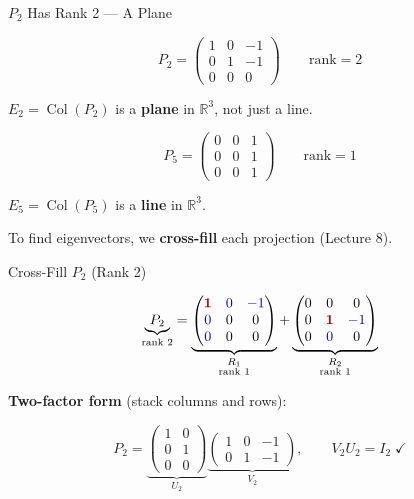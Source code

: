 \documentclass[10pt]{beamer}
\theoremstyle{definition}
\newcommand{\x}[1]{\alert{\textbf{#1}}}
\newcommand{\pvt}[1]{{\color{red!70!black}\textbf{#1}}}
\newcommand{\crs}[1]{{\color{blue!70!black}#1}}
\begin{document}
\begin{frame}{$P_2$ Has Rank 2 --- A Plane}

$$P_2 = \begin{pmatrix}1&0&-1\\0&1&-1\\0&0&0\end{pmatrix} \qquad \text{rank} = 2$$

\vfill

$E_2 = \operatorname{Col}(P_2)$ is a \x{plane} in $\mathbb{R}^3$, not just a line.

\vfill

$$P_5 = \begin{pmatrix}0&0&1\\0&0&1\\0&0&1\end{pmatrix} \qquad \text{rank} = 1$$

\vfill

$E_5 = \operatorname{Col}(P_5)$ is a \x{line} in $\mathbb{R}^3$.

\vfill\pause

To find eigenvectors, we \x{cross-fill} each projection (Lecture 8).

\end{frame}


\begin{frame}[shrink=10]{Cross-Fill $P_2$ (Rank 2)}

$$\underbrace{P_2}_{\text{rank }2} = \underbrace{\begin{pmatrix}\pvt{1}&\crs{0}&\crs{-1}\\\crs{0}&0&0\\\crs{0}&0&0\end{pmatrix}}_{\substack{R_1\\\text{rank }1}} + \underbrace{\begin{pmatrix}0&0&0\\0&\pvt{1}&\crs{-1}\\0&\crs{0}&0\end{pmatrix}}_{\substack{R_2\\\text{rank }1}}$$

\vfill\pause

\x{Two-factor form} (stack columns and rows):

$$P_2 = \underbrace{\begin{pmatrix}1&0\\0&1\\0&0\end{pmatrix}}_{U_2} \underbrace{\begin{pmatrix}1&0&-1\\0&1&-1\end{pmatrix}}_{V_2}, \qquad V_2 U_2 = I_2 \;\checkmark$$

\end{frame}
\end{document}
